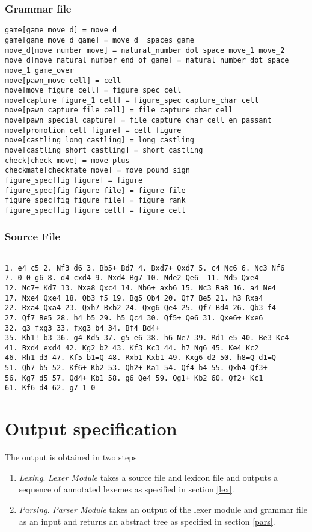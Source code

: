 \documentclass[a4paper,10pt]{article}
\begin{document}
\subsubsection{Grammar file}
\begin{verbatim}
game[game move_d] = move_d 
game[game move_d game] = move_d  spaces game
move_d[move number move] = natural_number dot space move_1 move_2
move_d[move natural_number end_of_game] = natural_number dot space move_1 game_over
move[pawn_move cell] = cell
move[move figure cell] = figure_spec cell
move[capture figure_1 cell] = figure_spec capture_char cell
move[pawn_capture file cell] = file capture_char cell
move[pawn_special_capture] = file capture_char cell en_passant
move[promotion cell figure] = cell figure
move[castling long_castling] = long_castling
move[castling short_castling] = short_castling
check[check move] = move plus
checkmate[checkmate move] = move pound_sign
figure_spec[fig figure] = figure
figure_spec[fig figure file] = figure file
figure_spec[fig figure file] = figure rank
figure_spec[fig figure cell] = figure cell
\end{verbatim}

\subsubsection{Source File}

\begin{verbatim}

1. e4 c5 2. Nf3 d6 3. Bb5+ Bd7 4. Bxd7+ Qxd7 5. c4 Nc6 6. Nc3 Nf6 
7. 0-0 g6 8. d4 cxd4 9. Nxd4 Bg7 10. Nde2 Qe6  11. Nd5 Qxe4 
12. Nc7+ Kd7 13. Nxa8 Qxc4 14. Nb6+ axb6 15. Nc3 Ra8 16. a4 Ne4 
17. Nxe4 Qxe4 18. Qb3 f5 19. Bg5 Qb4 20. Qf7 Be5 21. h3 Rxa4 
22. Rxa4 Qxa4 23. Qxh7 Bxb2 24. Qxg6 Qe4 25. Qf7 Bd4 26. Qb3 f4 
27. Qf7 Be5 28. h4 b5 29. h5 Qc4 30. Qf5+ Qe6 31. Qxe6+ Kxe6 
32. g3 fxg3 33. fxg3 b4 34. Bf4 Bd4+ 
35. Kh1! b3 36. g4 Kd5 37. g5 e6 38. h6 Ne7 39. Rd1 e5 40. Be3 Kc4 
41. Bxd4 exd4 42. Kg2 b2 43. Kf3 Kc3 44. h7 Ng6 45. Ke4 Kc2 
46. Rh1 d3 47. Kf5 b1=Q 48. Rxb1 Kxb1 49. Kxg6 d2 50. h8=Q d1=Q 
51. Qh7 b5 52. Kf6+ Kb2 53. Qh2+ Ka1 54. Qf4 b4 55. Qxb4 Qf3+ 
56. Kg7 d5 57. Qd4+ Kb1 58. g6 Qe4 59. Qg1+ Kb2 60. Qf2+ Kc1 
61. Kf6 d4 62. g7 1–0 
\end{verbatim}

\section{Output specification}
The output is obtained in two steps
\begin{enumerate}
\item \textit{Lexing}.  \textit{Lexer Module} takes a source file and lexicon file and outputs a sequence of annotated lexemes as specified in section \ref{lex}.
\item \textit{Parsing}. \textit{Parser Module} takes an output of the lexer module and grammar file as an input and returns an abstract tree as specified in section \ref{pars}.
\end{enumerate}
\end{document}
